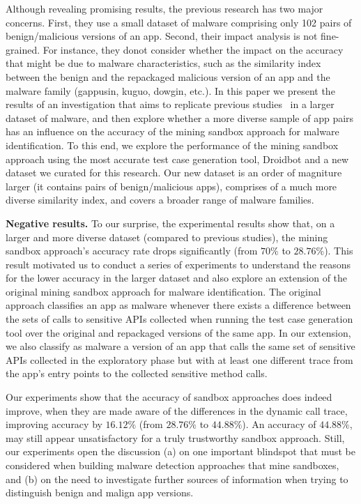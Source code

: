Although revealing promising results, the previous research has two major concerns. First, they use a small dataset of malware comprising only 102 pairs of benign/malicious versions of an app. Second, their impact analysis is not fine-grained. For instance, they donot consider whether the impact on the accuracy that might be due to malware characteristics, such as the similarity index between the benign and the repackaged malicious version of an app and the malware family (gappusin, kuguo, dowgin, etc.).
In this paper we present the results of an investigation that aims to replicate previous studies~\cite{DBLP:conf/wcre/BaoLL18,DBLP:conf/scam/CostaMCMVBC20} in a larger dataset of malware, and then explore whether a more diverse sample of app pairs has an influence on the accuracy of the mining sandbox approach for malware identification. To this end, we explore the performance of the mining sandbox approach using the most accurate test case generation tool, Droidbot and a new dataset we curated for this research. Our new dataset is an order of magniture larger (it contains \apps pairs of benign/malicious apps), comprises of a much more diverse similarity index, and covers a broader range of malware families. 



{\bf Negative results.} To our surprise, the experimental results show that, on a larger and more diverse dataset (compared to previous studies), the mining sandbox approach's accuracy rate drops significantly (from $70\%$ to $28.76\%$). This result motivated us to conduct a series of experiments to understand the reasons for the lower accuracy in the larger dataset and also explore an extension of the original mining sandbox approach for malware identification. The original approach classifies an app as malware whenever there exists a difference between the sets of calls to sensitive APIs collected when running the test case generation tool over the original and repackaged versions of the same app. In our extension, we also classify as malware a version of an app that calls the same set of sensitive APIs collected in the exploratory phase but with at least one different trace from the app's entry points to the collected sensitive method calls.


Our experiments show that the accuracy of sandbox approaches does indeed improve, when they are made aware of the differences in the dynamic call trace, improving accuracy by $16.12\%$ (from $28.76\%$ to $44.88\%$). 
An accuracy of $44.88\%$, may still appear unsatisfactory for a truly trustworthy sandbox approach. Still, 
our experiments open the discussion (a) on one important blindspot that must be considered when building 
malware detection approaches that mine sandboxes, and (b) on the need to investigate further sources of information when trying to distinguish benign and malign app versions. 

